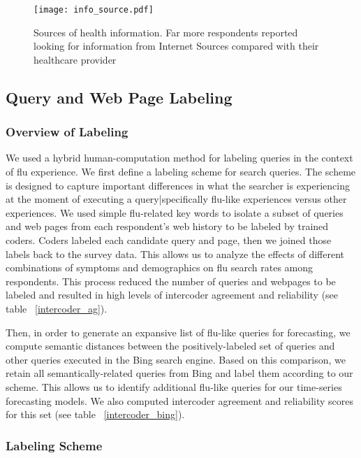 \documentclass[12pt]{article}
\begin{document}
\begin{figure}[!htbp]
\begin{centering}
   \texttt{[image: info\_source.pdf]}
  \caption{Sources of health information. Far more respondents reported looking for information from Internet Sources compared with their healthcare provider}
\label{info_source}
\end{centering}
\end{figure}


\subsection{Query and Web Page Labeling}

\subsubsection{Overview of Labeling}
We used a hybrid human-computation method for labeling queries in the context of flu experience. We first define a labeling scheme for search queries. The scheme is designed to capture important differences in what the searcher is experiencing at the moment of executing a query|specifically flu-like experiences versus other experiences. 
We used simple flu-related key words to isolate a subset of queries and web pages from each respondent's web history to be labeled by trained coders. Coders labeled each candidate query and page, then we joined those labels back to the survey data. This allows us to analyze the effects of different combinations of symptoms and demographics on flu search rates among respondents. This process reduced the number of queries and webpages to be labeled and resulted in high levels of intercoder agreement and reliability (see table ~\ref{intercoder_ag}).

Then, in order to generate an expansive list of flu-like queries for forecasting, we compute semantic distances between the positively-labeled set of queries and other queries executed in the Bing search engine. Based on this comparison, we retain all semantically-related queries from Bing and label them according to our scheme. This allows us to identify additional flu-like queries for our time-series forecasting models. We also computed intercoder agreement and reliability scores for this set (see table ~\ref{intercoder_bing}). 

\subsubsection{Labeling Scheme}
\end{document}
